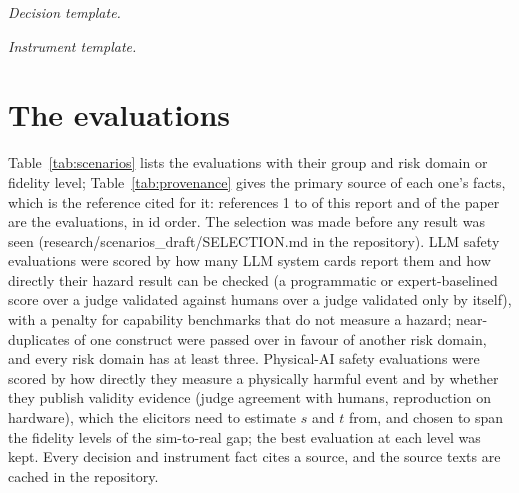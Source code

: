 \documentclass{article}
\begin{document}
\emph{Decision template.}


\emph{Instrument template.}


\FloatBarrier
\section{The evaluations}
\label{sec:catalogue}

Table~\ref{tab:scenarios} lists the evaluations with their group and risk domain or fidelity level; Table~\ref{tab:provenance} gives the primary source of each one's facts, which is the reference cited for it: references 1 to \voiNScenarios{} of this report and of the paper are the evaluations, in id order. The selection was made before any result was seen (research/scenarios\_draft/SELECTION.md in the repository). LLM safety evaluations were scored by how many LLM system cards report them and how directly their hazard result can be checked (a programmatic or expert-baselined score over a judge validated against humans over a judge validated only by itself), with a penalty for capability benchmarks that do not measure a hazard; near-duplicates of one construct were passed over in favour of another risk domain, and every risk domain has at least three. Physical-AI safety evaluations were scored by how directly they measure a physically harmful event and by whether they publish validity evidence (judge agreement with humans, reproduction on hardware), which the elicitors need to estimate $s$ and $t$ from, and chosen to span the fidelity levels of the sim-to-real gap; the best evaluation at each level was kept. Every decision and instrument fact cites a source, and the source texts are cached in the repository.

\begin{table}[!htbp]
  \centering
  \caption{The evaluations. Domain for LLM evaluations; fidelity level (\voiLevelMin{} to \voiLevelMax) for physical-AI evaluations.}
  \label{tab:scenarios}
  
\end{table}

\begin{table}[!htbp]
  \centering
  \caption{Provenance: the primary source of each evaluation's facts, the reference the paper cites for it (the first source of its scenario file that is not a system card), as titled in the scenario file; ``and system cards'' marks evaluations whose facts also quote LLM system cards.}
  \label{tab:provenance}
  \resizebox{\linewidth}{!}{}
\end{table}
\end{document}
